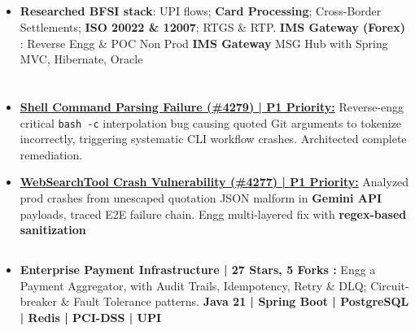 \documentclass[11pt]{article}
\begin{document}
\subsection*{}
\begin{itemize}[itemsep=0.2ex,leftmargin=*,topsep=0pt]
  \item \textbf{Researched BFSI stack}: UPI flows; \textbf{Card Processing}; Cross-Border Settlements; \textbf{ISO 20022 \& 12007}; RTGS \& RTP.
  \textbf{IMS Gateway (Forex) }: Reverse Engg \& POC Non Prod \textbf{IMS Gateway} MSG Hub with Spring MVC, Hibernate, Oracle
\end{itemize}

\section*{}

\subsection*{}
\begin{itemize}[itemsep=0.1ex,leftmargin=*,topsep=0pt]
  \item \uline{\textbf{\href{https://github.com/google-gemini/gemini-cli/issues/4279}{Shell Command Parsing Failure (\#4279)} | P1 Priority:}} Reverse-engg critical \texttt{bash -c} interpolation bug causing quoted Git arguments to tokenize incorrectly, triggering systematic CLI workflow crashes. Architected complete remediation.
  \item \uline{\textbf{\href{https://github.com/google-gemini/gemini-cli/issues/4277}{WebSearchTool Crash Vulnerability (\#4277)} | P1 Priority:}} Analyzed prod crashes from unescaped quotation JSON malform in \textbf{Gemini API} payloads, traced E2E failure chain. Engg multi-layered fix with \textbf{regex-based sanitization}
\end{itemize}
\vspace{0.5em}
\subsection*{}
\begin{itemize}[itemsep=0.1ex,leftmargin=*,topsep=0pt]
  \item \textbf{Enterprise Payment Infrastructure | 27 Stars, 5 Forks :} Engg a Payment Aggregator, with Audit Trails, Idempotency, Retry \& DLQ; Circuit-breaker \& Fault Tolerance patterns.
  \textbf{Java 21 | Spring Boot | PostgreSQL | Redis | PCI-DSS | UPI}
\end{itemize}
\vspace{0.5em}
\end{document}
